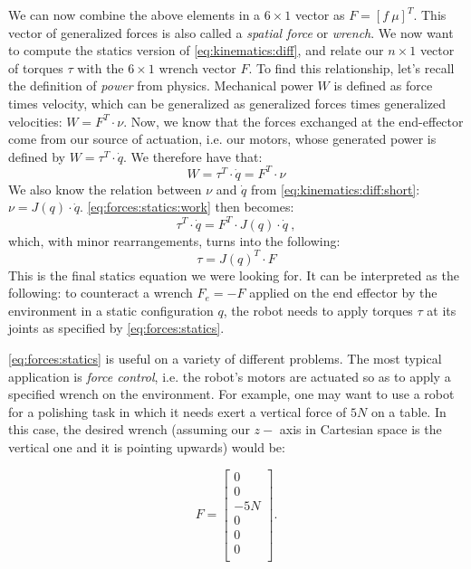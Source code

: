 We can now combine the above elements in a $6\times1$ vector as $F=[f \ \mu]^T$.
This vector of generalized forces is also called a \textsl{spatial force} or \textsl{wrench}.
We now want to compute the statics version of \cref{eq:kinematics:diff}, and relate our $n \times 1$ vector of torques $\tau$ with the $6\times1$ wrench vector $F$.
To find this relationship, let's recall the definition of \textsl{power} from physics. Mechanical power $W$ is defined as force times velocity, which can be generalized as generalized forces times generalized velocities: $W=F^T \cdot \nu$.
Now, we know that the forces exchanged at the end-effector come from our source of actuation, i.e. our motors, whose generated power is defined by $W=\tau ^T \cdot \dot{q}$. We therefore have that:
\begin{equation}\label{eq:forces:statics:work}
W=\tau ^T \cdot \dot{q} = F^T  \cdot \nu
\end{equation}
We also know the relation between $\nu$ and $\dot{q}$ from \cref{eq:kinematics:diff:short}: $\nu =J(q) \cdot \dot{q}$. \cref{eq:forces:statics:work} then becomes:
\begin{equation}
\tau ^T \cdot \dot{q} = F^T  \cdot J(q) \cdot \dot{q} \ ,
\end{equation}
which, with minor rearrangements, turns into the following:
\begin{equation}\label{eq:forces:statics}
\tau = J(q) ^T \cdot F
\end{equation}
This is the final statics equation we were looking for.
It can be interpreted as the following: to counteract a wrench $F_e = -F$ applied on the end effector by the environment in a static configuration $q$, the robot needs to apply torques $\tau$ at its joints as specified by \cref{eq:forces:statics}.

\cref{eq:forces:statics} is useful on a variety of different problems. The most typical application is \textsl{force control}, i.e. the robot's motors are actuated so as to apply a specified wrench on the environment. For example, one may want to use a robot for a polishing task in which it needs exert a vertical force of $5N$ on a table. In this case, the desired wrench (assuming our $z-$ axis in Cartesian space is the vertical one and it is pointing upwards) would be:

\begin{equation}
F=\left[\begin{array}{c} 0\\ 0\\ -5N\\ 0\\ 0\\ 0\\ \end{array} \right].
\end{equation}



